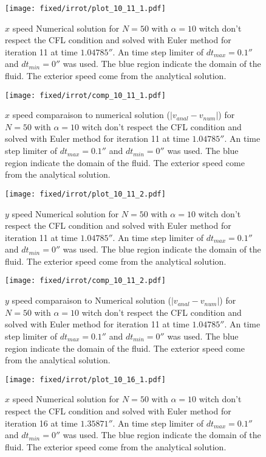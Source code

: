 \begin{figure}
\texttt{[image: fixed/irrot/plot\_10\_11\_1.pdf]}
\caption{$x$ speed Numerical solution for $N=50$ with $\alpha=10$ witch don't respect the CFL condition and solved with Euler method
for iteration 11 at time $\unit{1.04785}{\second}$.
An time step limiter of $dt_{max}=\unit{0.1}{\second}$ and $dt_{min}=\unit{0}{\second}$ was used.
The blue region indicate the domain of the fluid. The exterior speed come from the analytical solution.
\label{fix:plot_10_11_1}
}
\end{figure}

\begin{figure}
\texttt{[image: fixed/irrot/comp\_10\_11\_1.pdf]}
\caption{$x$ speed comparaison to numerical solution ($|v_{anal}-v_{num}|$) for $N=50$ with $\alpha=10$ witch don't respect the CFL condition and solved with Euler method
for iteration 11 at time $\unit{1.04785}{\second}$.
An time step limiter of $dt_{max}=\unit{0.1}{\second}$ and $dt_{min}=\unit{0}{\second}$ was used.
The blue region indicate the domain of the fluid. The exterior speed come from the analytical solution.
\label{fix:comp_10_11_1}
}
\end{figure}

\begin{figure}
\texttt{[image: fixed/irrot/plot\_10\_11\_2.pdf]}
\caption{$y$ speed Numerical solution for $N=50$ with $\alpha=10$ witch don't respect the CFL condition and solved with Euler method
for iteration 11 at time $\unit{1.04785}{\second}$.
An time step limiter of $dt_{max}=\unit{0.1}{\second}$ and $dt_{min}=\unit{0}{\second}$ was used.
The blue region indicate the domain of the fluid. The exterior speed come from the analytical solution.
\label{fix:plot_10_11_2}
}
\end{figure}

\begin{figure}
\texttt{[image: fixed/irrot/comp\_10\_11\_2.pdf]}
\caption{$y$ speed comparaison to Numerical solution ($|v_{anal}-v_{num}|$) for $N=50$ with $\alpha=10$ witch don't respect the CFL condition and solved with Euler method
for iteration 11 at time $\unit{1.04785}{\second}$.
An time step limiter of $dt_{max}=\unit{0.1}{\second}$ and $dt_{min}=\unit{0}{\second}$ was used.
The blue region indicate the domain of the fluid. The exterior speed come from the analytical solution.
\label{fix:comp_10_11_2}
}
\end{figure}

\begin{figure}
\texttt{[image: fixed/irrot/plot\_10\_16\_1.pdf]}
\caption{$x$ speed Numerical solution for $N=50$ with $\alpha=10$ witch don't respect the CFL condition and solved with Euler method
for iteration 16 at time $\unit{1.35871}{\second}$.
An time step limiter of $dt_{max}=\unit{0.1}{\second}$ and $dt_{min}=\unit{0}{\second}$ was used.
The blue region indicate the domain of the fluid. The exterior speed come from the analytical solution.
\label{fix:plot_10_16_1}
}
\end{figure}


